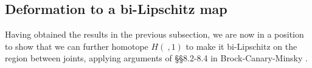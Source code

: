 \documentclass{amsart}
\theoremstyle{definition}
\numberwithin{figure}{section}
\numberwithin{equation}{section}
\newcommand{\ie}{i.e.\ }
\newcommand{\pretop}{\prec_\mathrm{top}}
\def\ck{\mathcal{K}}
\def\cv{\mathcal{V}}
\begin{document}


\subsection{Deformation to a bi-Lipschitz map}
\label{deforming to bi-Lipschitz}
Having obtained the results in the previous subsection, we are now in a position to show that we can further homotope $H(\ ,1)$ to make it bi-Lipschitz on the region between joints, applying  arguments of \S\S 8.2-8.4 in Brock-Canary-Minsky \cite{bcm}.
%
%
\end{document}
